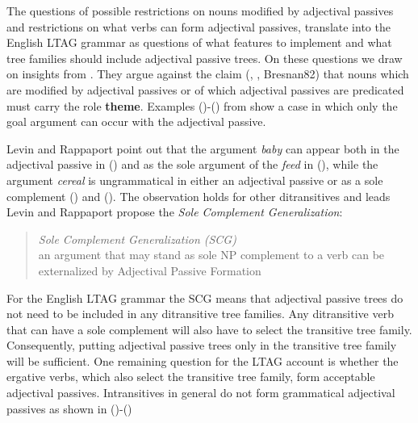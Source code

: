 \begin{figure}[h]
\end{figure}

\begin{figure}[h]
\end{figure}

The questions of possible restrictions on nouns modified by adjectival passives and restrictions on what verbs can form adjectival passives, translate into the English LTAG grammar as questions of what features to implement and what tree families should include adjectival passive trees.  On these questions we draw on insights from \cite{LevinRap}.  They argue against the claim (\cite{Wasow80}, \cite{Williams81}, {Bresnan82}) that nouns which are modified by adjectival passives or of which adjectival passives are predicated must carry the role {\bf theme}.  Examples ()-() from \cite{LevinRap} show a case in which only the goal argument can occur with the adjectival passive.  


Levin and Rappaport point out that the argument {\it baby\/} can appear both in the adjectival passive in () and as the sole argument of the {\it feed\/} in (), while the argument {\it cereal\/} is ungrammatical in either an adjectival passive or as a sole complement () and ().  The observation holds for other ditransitives and leads  Levin and Rappaport propose the {\it Sole Complement Generalization}:

\begin{quote}
{\it Sole Complement Generalization (SCG)}\\
an argument that may stand as sole NP complement to a verb can be externalized by Adjectival Passive Formation
\end{quote}

For the English LTAG grammar the SCG means that adjectival passive trees do not need to be included in any ditransitive tree families.  Any ditransitive verb that can have a sole complement will also have to select the transitive tree family.  Consequently, putting adjectival passive trees only in the transitive tree family will be sufficient.  One remaining question for the LTAG account is whether the ergative verbs, which also select the transitive tree family, form acceptable adjectival passives.  Intransitives in general do not form grammatical adjectival passives as shown in ()-()

